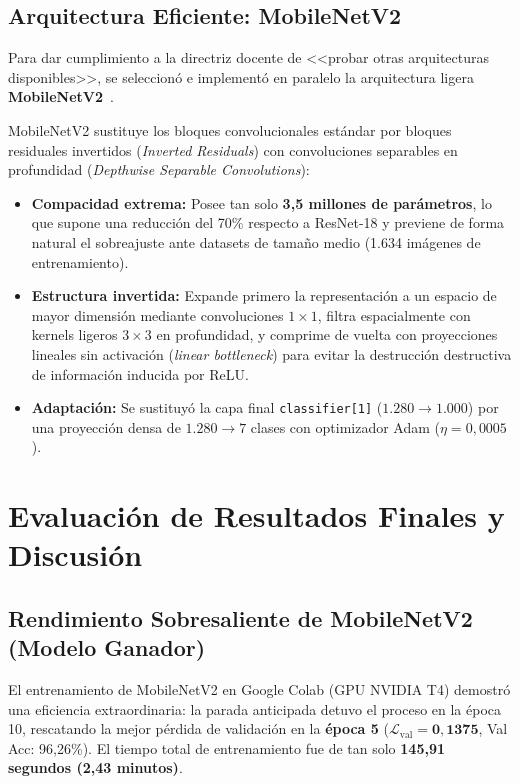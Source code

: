 \documentclass[11pt,a4paper]{article}
\begin{document}
\subsection{Arquitectura Eficiente: MobileNetV2}
Para dar cumplimiento a la directriz docente de <<probar otras arquitecturas disponibles>>, se seleccionó e implementó en paralelo la arquitectura ligera \textbf{MobileNetV2}~\cite{sandler2018mobilenetv2}.

MobileNetV2 sustituye los bloques convolucionales estándar por bloques residuales invertidos (\textit{Inverted Residuals}) con convoluciones separables en profundidad (\textit{Depthwise Separable Convolutions}):
\begin{itemize}[noitemsep]
    \item \textbf{Compacidad extrema:} Posee tan solo \textbf{3,5 millones de parámetros}, lo que supone una reducción del 70\% respecto a ResNet-18 y previene de forma natural el sobreajuste ante datasets de tamaño medio (1.634 imágenes de entrenamiento).
    \item \textbf{Estructura invertida:} Expande primero la representación a un espacio de mayor dimensión mediante convoluciones $1\times 1$, filtra espacialmente con kernels ligeros $3\times 3$ en profundidad, y comprime de vuelta con proyecciones lineales sin activación (\textit{linear bottleneck}) para evitar la destrucción destructiva de información inducida por ReLU.
    \item \textbf{Adaptación:} Se sustituyó la capa final \texttt{classifier[1]} ($1.280 \to 1.000$) por una proyección densa de $1.280 \to 7$ clases con optimizador Adam ($\eta = 0,0005$).
\end{itemize}

\FloatBarrier
\section{Evaluación de Resultados Finales y Discusión}

\subsection{Rendimiento Sobresaliente de MobileNetV2 (Modelo Ganador)}
El entrenamiento de MobileNetV2 en Google Colab (GPU NVIDIA T4) demostró una eficiencia extraordinaria: la parada anticipada detuvo el proceso en la época 10, rescatando la mejor pérdida de validación en la \textbf{época 5} ($\mathcal{L}_{\text{val}} = \mathbf{0,1375}$, Val Acc: 96,26\%). El tiempo total de entrenamiento fue de tan solo \textbf{145,91 segundos (2,43 minutos)}.
\end{document}
